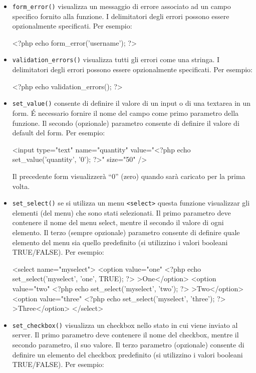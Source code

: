 \begin{itemize}
\item \verb|form_error()| visualizza un messaggio di errore associato ad un campo specifico fornito alla funzione. I delimitatori degli errori possono essere opzionalmente specificati. Per esempio:

\begin{code}
<?php echo form_error('username'); ?>
\end{code}

\item \verb|validation_errors()| visualizza tutti gli errori come una stringa. I delimitatori degli errori possono essere opzionalmente specificati. Per esempio:

\begin{code}
<?php echo validation_errors(); ?>
\end{code}

\item \verb|set_value()| consente di definire il valore di un input o di una textarea in un form. \'E necessario fornire il nome del campo come primo parametro della funzione. Il secondo (opzionale) parametro consente di definire il valore di default del form. Per esempio:

\begin{code}
<input type="text" name="quantity" value="<?php echo set_value('quantity', '0'); ?>" size="50" />
\end{code}

Il precedente form visualizzerà ``0'' (zero) quando sarà caricato per la prima volta.

\item \verb|set_select()| se si utilizza un menu \verb|<select>| questa funzione visualizzar gli elementi (del menu) che sono stati selezionati. Il primo parametro deve contenere il nome del menu select, mentre il secondo il valore di ogni elemento. Il terzo (sempre opzionale) parametro consente di definire quale elemento del menu sia quello predefinito (si utilizzino i valori booleani TRUE/FALSE). Per esempio:

\begin{code}
<select name="myselect">
<option value="one" <?php echo set_select('myselect', 'one', TRUE); ?> >One</option>
<option value="two" <?php echo set_select('myselect', 'two'); ?> >Two</option>
<option value="three" <?php echo set_select('myselect', 'three'); ?> >Three</option>
</select>
\end{code}

\item \verb|set_checkbox()| visualizza un checkbox nello stato in cui viene inviato al server. Il primo parametro deve contenere il nome del checkbox, mentre il secondo parametro, il suo valore. Il terzo parametro (opzionale) consente di definire un elemento del checkbox predefinito (si utilizzino i valori booleani TRUE/FALSE). Per esempio:


\end{itemize}

